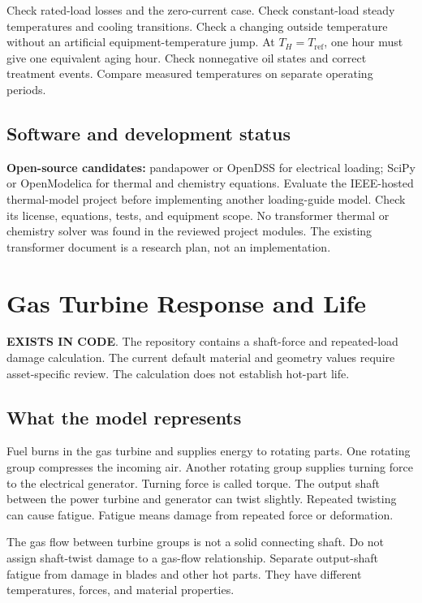 \documentclass[11pt,a4paper]{report}
\newcommand{\implemented}{\textbf{\textcolor{reportgreen}{EXISTS IN CODE}}}
\begin{document}
Check rated-load losses and the zero-current case.
Check constant-load steady temperatures and cooling transitions.
Check a changing outside temperature without an artificial equipment-temperature jump.
At $T_H=T_{\mathrm{ref}}$, one hour must give one equivalent aging hour.
Check nonnegative oil states and correct treatment events.
Compare measured temperatures on separate operating periods.

\section{Software and development status}
\textbf{Open-source candidates:} pandapower or OpenDSS for electrical loading;
SciPy or OpenModelica for thermal and chemistry equations.
Evaluate the IEEE-hosted thermal-model project before implementing another loading-guide model.
Check its license, equations, tests, and equipment scope.
No transformer thermal or chemistry solver was found in the reviewed project modules.
The existing transformer document is a research plan, not an implementation.

\chapter{Gas Turbine Response and Life}
\label{chap:turbine}
\implemented. The repository contains a shaft-force and repeated-load damage calculation.
The current default material and geometry values require asset-specific review.
The calculation does not establish hot-part life.

\section{What the model represents}
Fuel burns in the gas turbine and supplies energy to rotating parts.
One rotating group compresses the incoming air.
Another rotating group supplies turning force to the electrical generator.
Turning force is called torque.
The output shaft between the power turbine and generator can twist slightly.
Repeated twisting can cause fatigue.
Fatigue means damage from repeated force or deformation.

The gas flow between turbine groups is not a solid connecting shaft.
Do not assign shaft-twist damage to a gas-flow relationship.
Separate output-shaft fatigue from damage in blades and other hot parts.
They have different temperatures, forces, and material properties.
\end{document}
